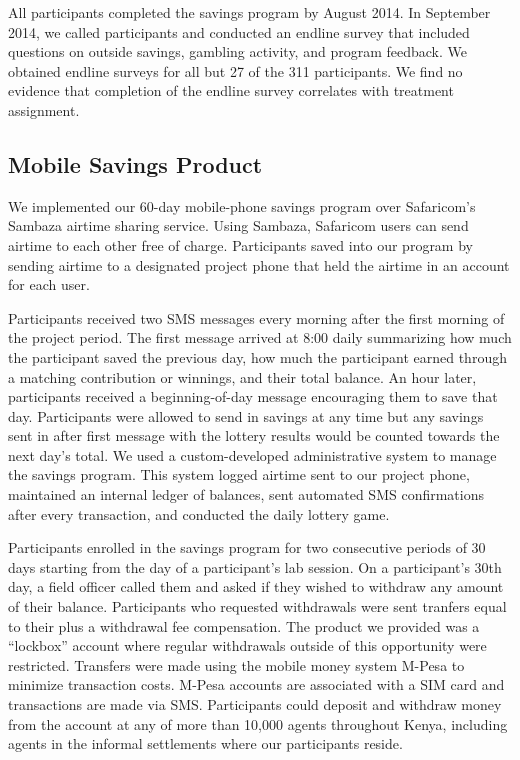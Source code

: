 \documentclass[12pt]{article}
\begin{document}
		All participants completed the savings program by August 2014. In September 2014, we called participants and conducted an endline survey that included questions on outside savings, gambling activity, and program feedback. We obtained endline surveys for all but 27 of the 311 participants. We find no evidence that completion of the endline survey correlates with treatment assignment.


		\clearpage

	\subsection{Mobile Savings Product}

		We implemented our 60-day mobile-phone savings program over Safaricom's Sambaza airtime sharing service. Using Sambaza, Safaricom users can send airtime to each other free of charge. Participants saved into our program by sending airtime to a designated project phone that held the airtime in an account for each user.

		Participants received two SMS messages every morning after the first morning of the project period. The first message arrived at 8:00 daily summarizing how much the participant saved the previous day, how much the participant earned through a matching contribution or winnings, and their total balance. An hour later, participants received a beginning-of-day message encouraging them to save that day. Participants were allowed to send in savings at any time but any savings sent in after first message with the lottery results would be counted towards the next day's total. We used a custom-developed administrative system to manage the savings program. This system logged airtime sent to our project phone, maintained an internal ledger of balances, sent automated SMS confirmations after every transaction, and conducted the daily lottery game.

		Participants enrolled in the savings program for two consecutive periods of 30 days starting from the day of a participant's lab session. On a participant's 30th day, a field officer called them and asked if they wished to withdraw any amount of their balance. Participants who requested withdrawals were sent tranfers equal to their plus a withdrawal fee compensation. The product we provided was a ``lockbox'' account where regular withdrawals outside of this opportunity were restricted. Transfers were made using the mobile money system M-Pesa to minimize transaction costs. M-Pesa accounts are associated with a SIM card and transactions are made via SMS. Participants could deposit and withdraw money from the account at any of more than 10,000 agents throughout Kenya, including agents in the informal settlements where our participants reside.
\end{document}
